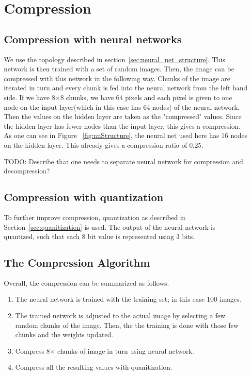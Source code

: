 \section{Compression}

\subsection{Compression with neural networks}
We use the topology described in section~\ref{sec:neural_net_structure}. This network is then trained with a set of random images. Then, the image can be compressed with this network in the following way. Chunks of the image are iterated in turn and every chunk is fed into the neural network from the left hand side. If we have 8$\times$8 chunks, we have 64 pixels and each pixel is given to one node on the input layer(which in this case has 64 nodes) of the neural network. Then the values on the hidden layer are taken as the "compressed" values. Since the hidden layer has fewer nodes than the input layer, this gives a compression. As one can see in Figure ~\ref{fig:nnStructure}, the neural net used here has 16 nodes on the hidden layer. This already gives a compression ratio of 0.25. 

TODO: Describe that one needs to separate neural network for compression and decompression?

\subsection{Compression with quantization}
To further improve compression, quantization as described in Section~\ref{sec:quanitization} is used. The output of the neural network is quantized, such that each 8 bit value is represented using 3 bits.  

\subsection{The Compression Algorithm}
\label{sec:compAlg}

Overall, the compression can be summarized as follows.

\begin{enumerate}
\item The neural network is trained with the training set; in this case 100 images.
\item The trained network is adjusted to the actual image by selecting a few random chunks of the image. Then, the the training is done with those few chunks and the weights updated. 
\item Compress 8$\times$ chunks of image in turn using neural network.
\item Compress all the resulting values with quanitization.

\end{enumerate}
